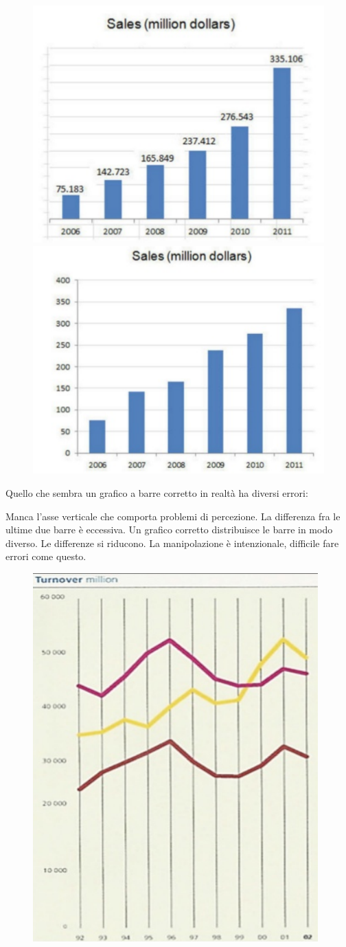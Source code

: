 \documentclass[12pt,a4paper]{report}
\begin{document}
\begin{figure}[h]
	\centering
	\includegraphics[width=.48\linewidth]{imgs datavis/altezza sprop .png}\hfil
	\includegraphics[width=.49\linewidth]{imgs datavis/sprop 2 .png}
	
	\caption{}\label{}
\end{figure}

Quello che sembra un grafico a barre corretto in realtà ha diversi errori:

Manca l’asse verticale che comporta problemi di percezione. La differenza fra le ultime due barre è eccessiva. Un grafico corretto distribuisce le barre in modo diverso. Le differenze si riducono. La manipolazione è intenzionale, difficile fare errori come questo.  


\begin{figure}[h]
	\centering
	\includegraphics[width=0.3\linewidth]{"imgs datavis/linee"}
	\caption{}
	\label{fig:linee}
\end{figure}
\end{document}
